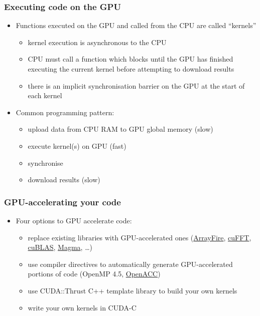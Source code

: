 \subsubsection{Executing code on the
GPU}\label{executing-code-on-the-gpu}

\begin{itemize}
\itemsep1pt\parskip0pt
\item
  Functions executed on the GPU and called from the CPU are called
  ``kernels''

  \begin{itemize}
  \itemsep1pt\parskip0pt
  \item
    kernel execution is asynchronous to the CPU
  \item
    CPU must call a function which blocks until the GPU has finished
    executing the current kernel before attempting to download results
  \item
    there is an implicit synchronisation barrier on the GPU at the start
    of each kernel
  \end{itemize}
\item
  Common programming pattern:

  \begin{itemize}
  \itemsep1pt\parskip0pt
  \item
    upload data from CPU RAM to GPU global memory (slow)
  \item
    execute kernel(s) on GPU (fast)
  \item
    synchronise
  \item
    download results (slow)
  \end{itemize}
\end{itemize}

\subsubsection{GPU-accelerating your
code}\label{gpu-accelerating-your-code}

\begin{itemize}
\itemsep1pt\parskip0pt
\item
  Four options to GPU accelerate code:

  \begin{itemize}
  \itemsep1pt\parskip0pt
  \item
    replace existing libraries with GPU-accelerated ones
    (\href{https://arrayfire.com/}{ArrayFire},
    \href{https://developer.nvidia.com/cufft}{cuFFT},
    \href{https://developer.nvidia.com/cublas}{cuBLAS},
    \href{http://icl.cs.utk.edu/magma/}{Magma}, \ldots{})
  \item
    use compiler directives to automatically generate GPU-accelerated
    portions of code (OpenMP 4.5,
    \href{http://www.openacc.org/}{OpenACC})
  \item
    use CUDA::Thrust C++ template library to build your own kernels
  \item
    write your own kernels in CUDA-C
  \end{itemize}
\end{itemize}

